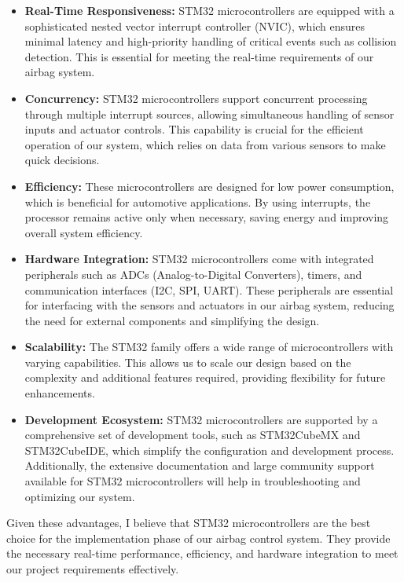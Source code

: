 \documentclass[12pt	]{article}
\begin{document}
\begin{itemize}
	\item 
	\textbf{Real-Time Responsiveness:} STM32 microcontrollers are equipped with a sophisticated nested vector interrupt controller (NVIC), which ensures minimal latency and high-priority handling of critical events such as collision detection. This is essential for meeting the real-time requirements of our airbag system.
	
	\item 
	\textbf{Concurrency:} STM32 microcontrollers support concurrent processing through multiple interrupt sources, allowing simultaneous handling of sensor inputs and actuator controls. This capability is crucial for the efficient operation of our system, which relies on data from various sensors to make quick decisions.
	
	\item 
	\textbf{Efficiency:} These microcontrollers are designed for low power consumption, which is beneficial for automotive applications. By using interrupts, the processor remains active only when necessary, saving energy and improving overall system efficiency.
	
	\item 
	\textbf{Hardware Integration:} STM32 microcontrollers come with integrated peripherals such as ADCs (Analog-to-Digital Converters), timers, and communication interfaces (I2C, SPI, UART). These peripherals are essential for interfacing with the sensors and actuators in our airbag system, reducing the need for external components and simplifying the design.
	
	\item 
	\textbf{Scalability:} The STM32 family offers a wide range of microcontrollers with varying capabilities. This allows us to scale our design based on the complexity and additional features required, providing flexibility for future enhancements.
	
	\item 
	\textbf{Development Ecosystem:} STM32 microcontrollers are supported by a comprehensive set of development tools, such as STM32CubeMX and STM32CubeIDE, which simplify the configuration and development process. Additionally, the extensive documentation and large community support available for STM32 microcontrollers will help in troubleshooting and optimizing our system.
\end{itemize}

Given these advantages, I believe that STM32 microcontrollers are the best choice for the implementation phase of our airbag control system. They provide the necessary real-time performance, efficiency, and hardware integration to meet our project requirements effectively.
\end{document}
